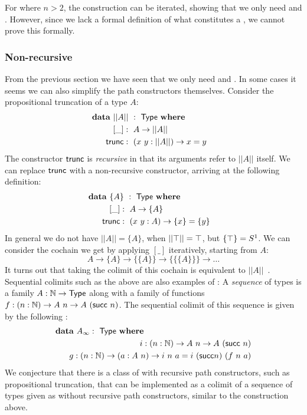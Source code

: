 \documentclass[a4paper,10pt]{article}
\begin{document}
For  where $n > 2$, the construction can be iterated,
showing that we only need \zeroconstructors and
\oneconstructors. However, since we lack a formal definition of what
constitutes a \hit, we cannot prove this formally.

\subsubsection{Non-recursive \hits}

From the previous section we have seen that we only need
\zeroconstructors and \oneconstructors. In some cases it seems we can
also simplify the path constructors themselves. Consider the
propositional truncation \hit of a type $A$:
%
\begin{alignat*}{2}
  &\rlap{$\data\ || A ||\ :\ \Type\ \where$} \\
  &&\ \ [\_]   &:\ A \to || A || \\
  &&\ \ \trunc &:\ (x\ y : || A ||) \to x = y
\end{alignat*}
%
The constructor $\mathsf{trunc}$ is \emph{recursive} in that its arguments
refer to $|| A ||$ itself. We can replace $\mathsf{trunc}$ with a
non-recursive constructor, arriving at the following definition:
%
\begin{alignat*}{2}
  &\rlap{$\data\ \{ A \}\ :\ \Type\ \where$} \\
  &&\ \ [\_]   &:\ A \to \{ A \} \\
  &&\ \ \trunc &:\ (x\ y : A) \to \{ x \} = \{ y \}
\end{alignat*}
%
In general we do not have $|| A || = \{ A \}$, \eg when
$|| \top || = \top$, but $\{ \top \} = S^1$. We can consider
the cochain we get by applying $[\_]$ iteratively, starting from $A$:
$$
A \to \{ A \} \to \{ \{ A \} \} \to \{ \{ \{ A \} \} \} \to \hdots
$$
It turns out that taking the colimit of this cochain is equivalent to
$|| A ||$~\cite{VanDoorn2015}. Sequential colimits such as the above
are also examples of \hits:
%
A \emph{sequence} of types is a family $A : \mathbb{N} \to \mathsf{Type}$ along with
a family of functions $f : (n : \mathbb{N}) \to A\ n \to A\ (\mathsf{succ}\ n)$. The
sequential colimit of this sequence is given by the following \hit:
%
\begin{alignat*}{2}
  &\rlap{$\data\ A_\infty :\ \Type\ \where$} \\
  &&\ \ i : (n : \Nat) \to A\ n \to A\ (\suc\ n) \\
  &&\ \ g : (n : \Nat) \to (a : A\ n) \to i\ n\ a = i\ (\suc n)\ (f\ n\ a)
\end{alignat*}
%
We conjecture that there is a class of \hits with recursive path
constructors, such as propositional truncation, that can be
implemented as a colimit of a sequence of types given as \hits without
recursive path constructors, similar to the construction above.
\end{document}
